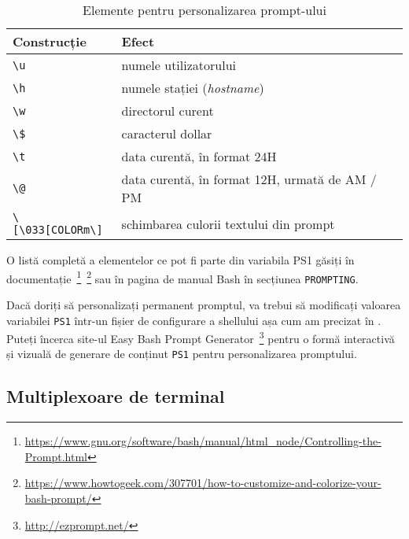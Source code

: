 \begin{table}[!htb]
  \caption{Elemente pentru personalizarea prompt-ului}
  \begin{center}
    \begin{tabular}{ p{} p{} }
      \toprule
        \textbf{Construcție} &
        \textbf{Efect} \\
      \midrule

        \verb|\u| &
        numele utilizatorului \\

        \verb|\h| &
        numele stației (\textit{hostname}) \\

        \verb|\w| &
        directorul curent \\

        \verb|\$| &
        caracterul dollar \\

        \verb|\t| &
        data curentă, în format 24H \\

        \verb|\@| &
        data curentă, în format 12H, urmată de AM / PM \\

        \verb|\[\033[COLORm\]| &
        schimbarea culorii textului din prompt \\
      \bottomrule
    \end{tabular}
    \label{tab:cli:prompt}
  \end{center}
\end{table}

O listă completă a elementelor ce pot fi parte din variabila PS1 găsiți în
documentație~\footnote{\url{https://www.gnu.org/software/bash/manual/html_node/Controlling-the-Prompt.html}}~\footnote{\url{https://www.howtogeek.com/307701/how-to-customize-and-colorize-your-bash-prompt/}} sau în pagina de manual Bash în secțiunea \texttt{PROMPTING}.

Dacă doriți să personalizați permanent promptul, va trebui să modificați valoarea
variabilei \texttt{PS1} într-un fișier de configurare a shellului așa cum am precizat în . Puteți încerca site-ul Easy Bash Prompt
Generator~\footnote{\url{http://ezprompt.net/}} pentru o formă interactivă și vizuală de
generare de conținut \texttt{PS1} pentru personalizarea promptului.

\subsection{Multiplexoare de terminal}
\label{sec:cli:shell-start:mux}

